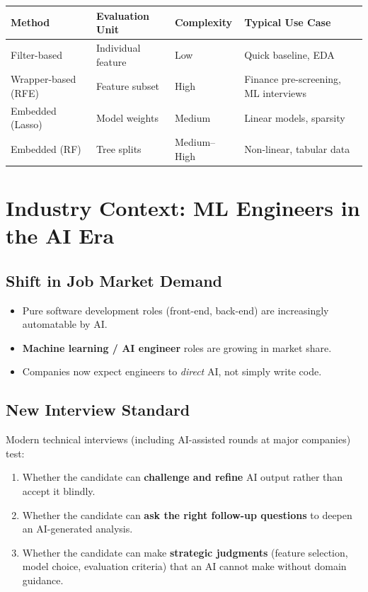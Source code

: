 \documentclass[11pt]{article}
\begin{document}
\begin{center}
\begin{tabular}{@{}llll@{}}
\toprule
\textbf{Method}   & \textbf{Evaluation Unit} & \textbf{Complexity} & \textbf{Typical Use Case} \\
\midrule
Filter-based      & Individual feature       & Low                 & Quick baseline, EDA       \\
Wrapper-based (RFE) & Feature subset         & High                & Finance pre-screening, ML interviews \\
Embedded (Lasso)  & Model weights            & Medium              & Linear models, sparsity   \\
Embedded (RF)     & Tree splits              & Medium--High        & Non-linear, tabular data  \\
\bottomrule
\end{tabular}
\end{center}


\section{Industry Context: ML Engineers in the AI Era}

\subsection{Shift in Job Market Demand}
\begin{itemize}
    \item Pure software development roles (front-end, back-end) are increasingly automatable by AI.
    \item \textbf{Machine learning / AI engineer} roles are growing in market share.
    \item Companies now expect engineers to \emph{direct} AI, not simply write code.
\end{itemize}

\subsection{New Interview Standard}
Modern technical interviews (including AI-assisted rounds at major companies) test:
\begin{enumerate}
    \item Whether the candidate can \textbf{challenge and refine} AI output rather than accept it blindly.
    \item Whether the candidate can \textbf{ask the right follow-up questions} to deepen an AI-generated analysis.
    \item Whether the candidate can make \textbf{strategic judgments} (feature selection, model choice, evaluation criteria) that an AI cannot make without domain guidance.
\end{enumerate}
\end{document}

